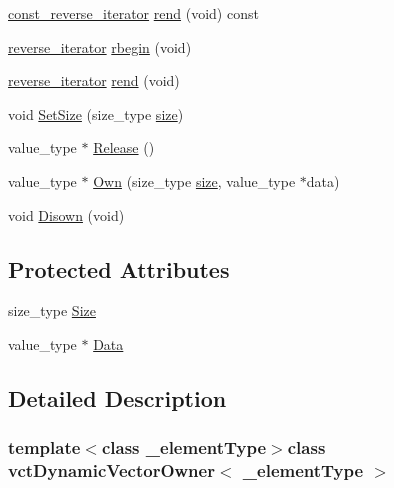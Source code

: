 \begin{DoxyCompactItemize}
\item 
\hyperlink{classvct_dynamic_vector_owner_ab157dd93c9061bb74e4a5983606e200a}{const\-\_\-reverse\-\_\-iterator} \hyperlink{classvct_dynamic_vector_owner_afe560caeeef45f4fbd99ea6b02bdb290}{rend} (void) const 
\item 
\hyperlink{classvct_dynamic_vector_owner_a963d655b94fe07a9c7abbee2705005d1}{reverse\-\_\-iterator} \hyperlink{classvct_dynamic_vector_owner_a83591489616a140f3750314efd0b262c}{rbegin} (void)
\item 
\hyperlink{classvct_dynamic_vector_owner_a963d655b94fe07a9c7abbee2705005d1}{reverse\-\_\-iterator} \hyperlink{classvct_dynamic_vector_owner_a0a0aa16342ae5fe6ef5d97c2a0282296}{rend} (void)
\item 
void \hyperlink{classvct_dynamic_vector_owner_a71a733504a58a4b1776c11d66ecb8a6a}{Set\-Size} (size\-\_\-type \hyperlink{classvct_dynamic_vector_owner_a6a2cc98b79ff181f755df05a8d45780a}{size})
\item 
value\-\_\-type $\ast$ \hyperlink{classvct_dynamic_vector_owner_ad93bcc06c4ac4acdfb6fbcd8e7a279d2}{Release} ()
\item 
value\-\_\-type $\ast$ \hyperlink{classvct_dynamic_vector_owner_af2036e3557e3575ece8de77090ca503a}{Own} (size\-\_\-type \hyperlink{classvct_dynamic_vector_owner_a6a2cc98b79ff181f755df05a8d45780a}{size}, value\-\_\-type $\ast$data)
\item 
void \hyperlink{classvct_dynamic_vector_owner_a4a5a32779467d317910fc8db3a8cd79c}{Disown} (void)
\end{DoxyCompactItemize}
\subsection*{Protected Attributes}
\begin{DoxyCompactItemize}
\item 
size\-\_\-type \hyperlink{classvct_dynamic_vector_owner_a83223f1718c6ac4f9ec7eda64ba21b2e}{Size}
\item 
value\-\_\-type $\ast$ \hyperlink{classvct_dynamic_vector_owner_aa6c177cef7a3a1e4dd9eeed77dc4a111}{Data}
\end{DoxyCompactItemize}


\subsection{Detailed Description}
\subsubsection*{template$<$class \-\_\-element\-Type$>$class vct\-Dynamic\-Vector\-Owner$<$ \-\_\-element\-Type $>$}

